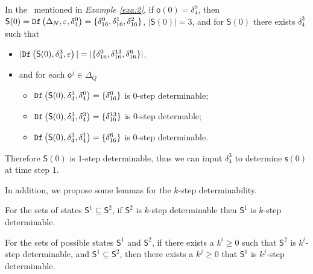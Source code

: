 \begin{example}\label{exa:9}
In the \BCN\ mentioned in {\em Example \ref{exa:2}}, if $\mathsf{o}(0)=\delta_4^0$, then $\mathsf{S}(0)={\tt Df}\left(\Delta_N,\varepsilon,\delta_4^0\right)=\{\delta_{16}^0,\delta_{16}^1,\delta_{16}^2\}$, $|\mathsf{S}(0)|=3$, and for $\mathsf{S}(0)$ there exists $\delta_{4}^3$ such that 
 \begin{itemize}
 \item  $|{\tt Df}\left(\mathsf{S}(0),\delta_{4}^3,\varepsilon\right)|=|\{\delta_{16}^0,\delta_{16}^{13},\delta_{16}^6\}|$,
 \item   and for each $\mathsf{o}^{j}\in \Delta_Q$
  \begin{itemize}
  \item   ${\tt Df}\left(\mathsf{S}(0),\delta_{4}^3,\delta_{4}^0\right)=\{\delta_{16}^0\}$ is $0$-step determinable;
 \item  ${\tt Df}\left(\mathsf{S}(0),\delta_{4}^3,\delta_{4}^3\right)=\{\delta_{16}^{13}\}$ is $0$-step determable;
  \item  ${\tt Df}\left(\mathsf{S}(0),\delta_{4}^3,\delta_{4}^1\right)=\{\delta_{16}^{6}\}$ is $0$-step determinable.
 \end{itemize}
 \end{itemize}
 Therefore $\mathsf{S}(0)$ is $1$-step determinable, thus we can  input $\delta_{4}^3$ to determine $\mathsf{s}(0)$ at time step $1$.
\end{example}  

In addition, we propose some lemmas for the $k$-step determinability.

\begin{lemma}
For the sets of states $\mathsf{S}^{1}\subseteq \mathsf{S}^{2}$, if $\mathsf{S}^{2}$ is $k$-step determinable %
then $\mathsf{S}^{1}$ is $k$-step determinable.
  \label{lemm:1}
\end{lemma}

\begin{lemma}
For the sets of possible states $\mathsf{S}^{1}$ and $\mathsf{S}^{2}$, if there exists a $k^{i}\ge 0$ such that $\mathsf{S}^{2}$ is $k^{i}$-step determinable, and $\mathsf{S}^{1}\subseteq \mathsf{S}^{2}$, then there exists a $k^{j}\ge 0$ that $\mathsf{S}^{1}$ is $k^{j}$-step determinable.
\label{lemm:2}
\end{lemma}

